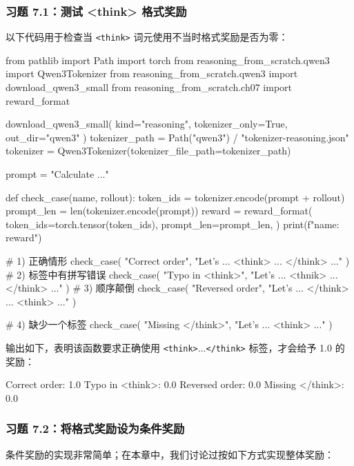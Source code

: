 \subsubsection*{习题 7.1：测试 \textless{}think\textgreater{} 格式奖励}

以下代码用于检查当 \texttt{\textless{}think\textgreater{}} 词元使用不当时格式奖励是否为零：

\begin{codebox}
from pathlib import Path
import torch
from reasoning_from_scratch.qwen3 import Qwen3Tokenizer
from reasoning_from_scratch.qwen3 import download_qwen3_small
from reasoning_from_scratch.ch07 import reward_format

download_qwen3_small(
    kind="reasoning", tokenizer_only=True, out_dir="qwen3"
)
tokenizer_path = Path("qwen3") / "tokenizer-reasoning.json"
tokenizer = Qwen3Tokenizer(tokenizer_file_path=tokenizer_path)

prompt = "Calculate ..."

def check_case(name, rollout):
    token_ids = tokenizer.encode(prompt + rollout)
    prompt_len = len(tokenizer.encode(prompt))
    reward = reward_format(
        token_ids=torch.tensor(token_ids),
        prompt_len=prompt_len,
    )
    print(f"{name}: {reward}")

# 1) 正确情形
check_case(
    "Correct order",
    "Let's ... <think> ... </think> ..."
)
# 2) 标签中有拼写错误
check_case(
    "Typo in <think>",
    "Let's ... <thnik> ... </think> ..."
)
# 3) 顺序颠倒
check_case(
    "Reversed order",
    "Let's ... </think> ... <think> ..."
)

# 4) 缺少一个标签
check_case(
    "Missing </think>",
    "Let's ... <think> ..."
)
\end{codebox}

输出如下，表明该函数要求正确使用 \texttt{\textless{}think\textgreater{}}...\texttt{\textless{}/think\textgreater{}} 标签，才会给予 1.0 的奖励：

\begin{codebox}
Correct order: 1.0
Typo in <think>: 0.0
Reversed order: 0.0
Missing </think>: 0.0
\end{codebox}

\subsubsection*{习题 7.2：将格式奖励设为条件奖励}

条件奖励的实现非常简单；在本章中，我们讨论过按如下方式实现整体奖励：

